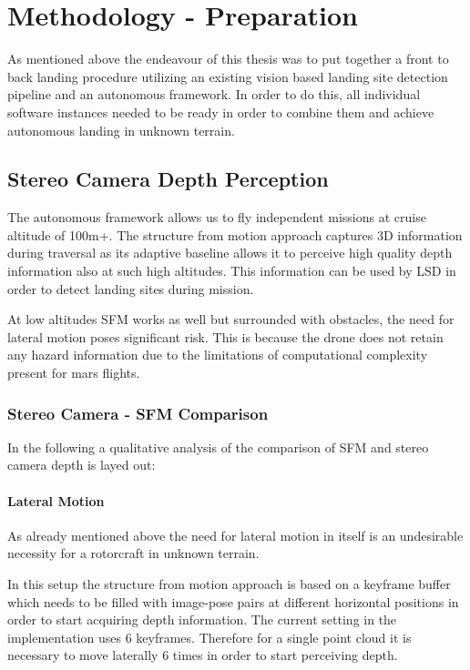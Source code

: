 \chapter{Methodology - Preparation}
\label{sec:methodology_preparation}

As mentioned above the endeavour of this thesis was to put together a front to back landing procedure utilizing an existing vision based landing site detection pipeline and an autonomous framework. In order to do this, all individual software instances needed to be ready in order to combine them and achieve autonomous landing in unknown terrain.

\section{Stereo Camera Depth Perception} \label{sec:StereoDepth}

The autonomous framework\citep{Autonomy} allows us to fly independent missions at cruise altitude of 100m+. The structure from motion approach captures 3D information during traversal as its adaptive baseline allows it to perceive high quality depth information also at such high altitudes. This information can be used by LSD in order to detect landing sites during mission. 

At low altitudes SFM works as well but surrounded with obstacles, the need for lateral motion poses significant risk. This is because the drone does not retain any hazard information due to the limitations of computational complexity present for mars flights. 

\subsection{Stereo Camera - SFM Comparison}

In the following a qualitative analysis of the comparison of SFM and stereo camera depth is layed out:

\subsubsection{Lateral Motion}

As already mentioned above the need for lateral motion in itself is an undesirable necessity for a rotorcraft in unknown terrain. 

In this setup the structure from motion approach is based on a keyframe buffer which needs to be filled with image-pose pairs at different horizontal positions in order to start acquiring depth information. The current setting in the implementation \citet{SFM} uses 6 keyframes. Therefore for a single point cloud it is necessary to move laterally 6 times in order to start perceiving depth. 

